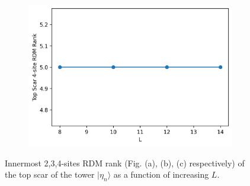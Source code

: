 \documentclass[11pt]{article}
\begin{document}
\begin{itemize}
\begin{itemize}
\begin{figure}[H]
\begin{subfigure}{0.45\textwidth}
        \includegraphics[width=\linewidth]{hb_scar_4.png}
        \caption{}
        \label{fig:image3hb}
    \end{subfigure}

    \caption{Innermost 2,3,4-sites RDM  rank (Fig. (a), (b), (c) respectively) of the top scar of the tower $|\eta_n\rangle$ as a function of increasing $L$.}
    \label{fig:hb_scars_tower}
\end{figure}


\end{itemize}
\end{itemize}
\end{document}
